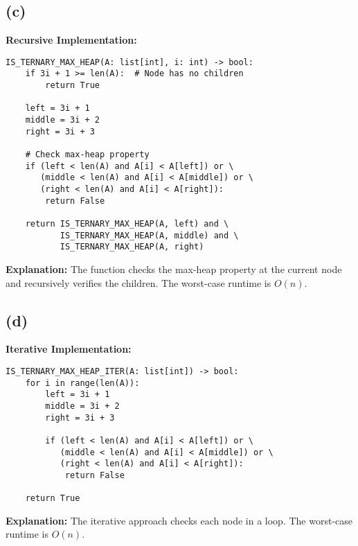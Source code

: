 \documentclass[12pt]{article}
\begin{document}
\subsection*{(c)}
\textbf{Recursive Implementation:}
\begin{lstlisting}
IS_TERNARY_MAX_HEAP(A: list[int], i: int) -> bool:
    if 3i + 1 >= len(A):  # Node has no children
        return True

    left = 3i + 1
    middle = 3i + 2
    right = 3i + 3

    # Check max-heap property
    if (left < len(A) and A[i] < A[left]) or \
       (middle < len(A) and A[i] < A[middle]) or \
       (right < len(A) and A[i] < A[right]):
        return False

    return IS_TERNARY_MAX_HEAP(A, left) and \
           IS_TERNARY_MAX_HEAP(A, middle) and \
           IS_TERNARY_MAX_HEAP(A, right)
\end{lstlisting}
\textbf{Explanation:} The function checks the max-heap property at the current node and recursively verifies the children. The worst-case runtime is \(O(n)\).

\subsection*{(d)}
\textbf{Iterative Implementation:}
\begin{lstlisting}
IS_TERNARY_MAX_HEAP_ITER(A: list[int]) -> bool:
    for i in range(len(A)):
        left = 3i + 1
        middle = 3i + 2
        right = 3i + 3

        if (left < len(A) and A[i] < A[left]) or \
           (middle < len(A) and A[i] < A[middle]) or \
           (right < len(A) and A[i] < A[right]):
            return False

    return True
\end{lstlisting}
\textbf{Explanation:} The iterative approach checks each node in a loop. The worst-case runtime is \(O(n)\).
\end{document}
